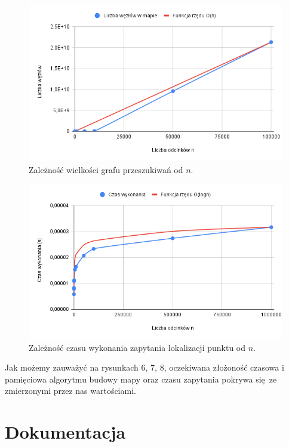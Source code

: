 \documentclass[11pt,a4paper]{article}
\begin{document}
\begin{figure}[H]
    \centering
    \includegraphics[scale=0.46]{./res/figs/build_sizes_graph.png}
    \caption{Zależność wielkości grafu przeszukiwań od $n$.}
\end{figure}

\begin{figure}[H]
    \centering
    \includegraphics[scale=0.46]{./res/figs/query_times_graph.png}
    \caption{Zależność czasu wykonania zapytania lokalizacji punktu od $n$.}
\end{figure}

Jak możemy zauważyć na rysunkach 6, 7, 8, oczekiwana złożoność
czasowa i pamięciowa algorytmu budowy mapy oraz czasu zapytania
pokrywa się ze zmierzonymi przez nas wartościami.

\section{Dokumentacja}
\end{document}
